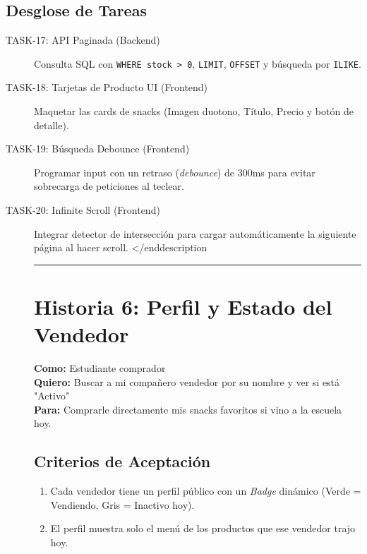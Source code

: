 \documentclass[11pt, letterpaper]{article}
\begin{document}
    \subsection{Desglose de Tareas}
    \begin{description}
        \item[TASK-17: API Paginada (Backend)] Consulta SQL con \texttt{WHERE stock > 0}, \texttt{LIMIT}, \texttt{OFFSET} y búsqueda por \texttt{ILIKE}.
        \item[TASK-18: Tarjetas de Producto UI (Frontend)] Maquetar las cards de snacks (Imagen duotono, Título, Precio y botón de detalle).
        \item[TASK-19: Búsqueda Debounce (Frontend)] Programar input con un retraso (\textit{debounce}) de 300ms para evitar sobrecarga de peticiones al teclear.
        \item[TASK-20: Infinite Scroll (Frontend)] Integrar detector de intersección para cargar automáticamente la siguiente página al hacer scroll.
    </end{description}

    \vspace{1em}
    \hrule
    \vspace{2em}

    \section{Historia 6: Perfil y Estado del Vendedor}

    \begin{tcolorbox}[colback=red!5!white,colframe=red!75!black,title=HU-06: Rastreo de Vendedores Favoritos]
        \textbf{Como:} Estudiante comprador \\
        \textbf{Quiero:} Buscar a mi compañero vendedor por su nombre y ver si está "Activo" \\
        \textbf{Para:} Comprarle directamente mis snacks favoritos si vino a la escuela hoy.
    \end{tcolorbox}

    \subsection{Criterios de Aceptación}
    \begin{enumerate}[label=\bfseries\arabic*.]
        \item Cada vendedor tiene un perfil público con un \textit{Badge} dinámico (Verde = Vendiendo, Gris = Inactivo hoy).
        \item El perfil muestra solo el menú de los productos que ese vendedor trajo hoy.
    \end{enumerate}


\end{description}
\end{document}
